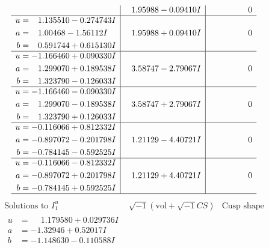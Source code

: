 \documentclass[1p]{elsarticle_modified}
\theoremstyle{definition}
\newcommand{\I}{\sqrt{-1}}
\begin{document}
$$\begin{array}{c|c|c}
 & \phantom{-}1.95988 - 0.09410 I & \phantom{-0.000000 } 0 \\ \hline\begin{aligned}
u &= \phantom{-}1.135510 - 0.274743 I \\
a &= \phantom{-}1.00468 - 1.56112 I \\
b &= \phantom{-}0.591744 + 0.615130 I\end{aligned}
 & \phantom{-}1.95988 + 0.09410 I & \phantom{-0.000000 } 0 \\ \hline\begin{aligned}
u &= -1.166460 + 0.090330 I \\
a &= \phantom{-}1.299070 + 0.189538 I \\
b &= \phantom{-}1.323790 - 0.126033 I\end{aligned}
 & \phantom{-}3.58747 - 2.79067 I & \phantom{-0.000000 } 0 \\ \hline\begin{aligned}
u &= -1.166460 - 0.090330 I \\
a &= \phantom{-}1.299070 - 0.189538 I \\
b &= \phantom{-}1.323790 + 0.126033 I\end{aligned}
 & \phantom{-}3.58747 + 2.79067 I & \phantom{-0.000000 } 0 \\ \hline\begin{aligned}
u &= -0.116066 + 0.812332 I \\
a &= -0.897072 - 0.201798 I \\
b &= -0.784145 - 0.592525 I\end{aligned}
 & \phantom{-}1.21129 - 4.40721 I & \phantom{-0.000000 } 0 \\ \hline\begin{aligned}
u &= -0.116066 - 0.812332 I \\
a &= -0.897072 + 0.201798 I \\
b &= -0.784145 + 0.592525 I\end{aligned}
 & \phantom{-}1.21129 + 4.40721 I & \phantom{-0.000000 } 0\\
 \hline 
 \end{array}$$\newpage$$\begin{array}{c|c|c}  
\text{Solutions to }I^u_{1}& \I (\text{vol} + \sqrt{-1}CS) & \text{Cusp shape}\\
 \hline 
\begin{aligned}
u &= \phantom{-}1.179580 + 0.029736 I \\
a &= -1.32946 + 0.52017 I \\
b &= -1.148630 - 0.110588 I\end{aligned}

\end{array}$$
\end{document}
